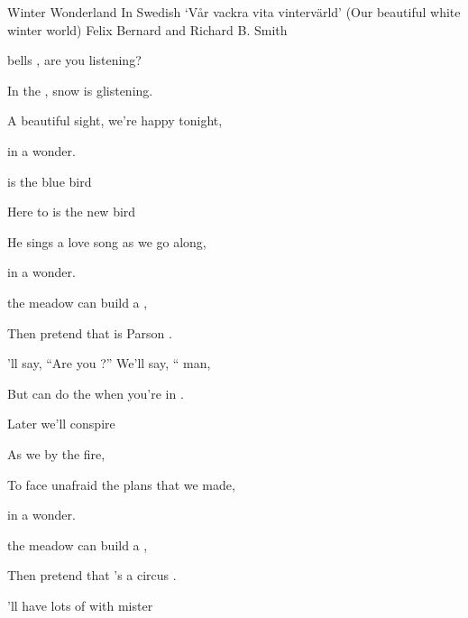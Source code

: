 \begin{SBSong}{Winter Wonderland}
    {In Swedish `V\aa r vackra vita vinterv\"arld' (Our beautiful white winter world)}
    {Felix Bernard and Richard B. Smith }
  \begin{SBVerse}
     bells , are you listening?
    
    In the , snow is glistening.
    
    A beautiful sight, we're happy tonight,
    
     in a  wonder.
  \end{SBVerse}
  \begin{SBVerse}
      is the blue bird
    
    Here to  is the new bird
    
    He sings a love song as we go along,
    
     in a  wonder.
  \end{SBVerse}
  \begin{SBVerse}
     the meadow  can build a ,
    
    Then pretend that  is Parson .
    
    'll say, ``Are you  ?'' We'll say, `` man,
    
    But  can do the  when you're in .
  \end{SBVerse}
  
  \begin{SBVerse}
    Later  we'll conspire
    
    As we  by the fire,
    
    To face unafraid the plans that we made,
    
     in a  wonder.
  \end{SBVerse}
  \begin{SBVerse}
     the meadow  can build a ,
    
    Then pretend that 's a circus .
    
    'll have lots of  with mister 
    

\end{SBVerse}
\end{SBSong}
